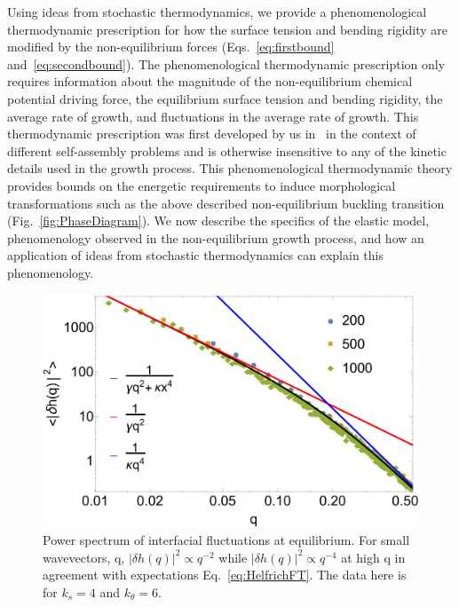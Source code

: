 \documentclass[amsmath,preprintnumbers,10pt,nofootinbib,prl,twocolumn]{revtex4-1}
\begin{document}
Using ideas from stochastic thermodynamics, we provide a phenomenological thermodynamic prescription for how the surface tension and bending rigidity are modified by the non-equilibrium forces (Eqs.~\ref{eq:firstbound} and~\ref{eq:secondbound}). The phenomenological thermodynamic prescription only requires information about the magnitude of the non-equilibrium chemical potential driving force, the equilibrium surface tension and bending rigidity, the average rate of growth, and fluctuations in the average rate of growth. This thermodynamic prescription was first developed by us in~\cite{Nguyen2016} in the context of different self-assembly problems and is otherwise insensitive to any of the kinetic details used in the growth process. This phenomenological thermodynamic theory provides bounds on the energetic requirements to induce morphological transformations such as the above described non-equilibrium buckling transition (Fig.~\ref{fig:PhaseDiagram}). 
We now describe the specifics of the elastic model, phenomenology observed in the non-equilibrium growth process, and how an application of ideas from stochastic thermodynamics can explain this phenomenology. 


\begin{figure}[tbb]
\centering
\includegraphics[scale=0.29]{scalingindependentofsizeFig2.pdf}
\caption{Power spectrum of interfacial fluctuations at equilibrium. For small wavevectors, q, $|\delta h(q)|^2\propto q^{-2}$ while $|\delta h(q)|^2\propto q^{-4}$ at high q in agreement with expectations Eq.~\ref{eq:HelfrichFT}. The data here is for $k_s=4$ and $k_\theta = 6$.} \label{fig:HelfrichScaling}
\end{figure}
\end{document}
